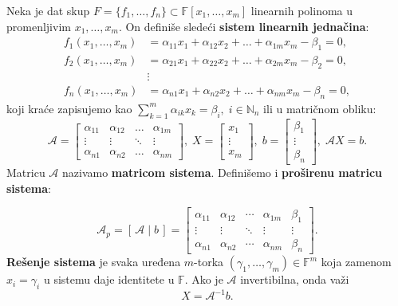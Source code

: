\documentclass[a4paper,12pt,twoside]{report}
\numberwithin{algorithm}{section}
\begin{document}
Neka je dat skup $F = \{f_1, \dots, f_n\} \subset \mathbb{F}[x_1, \dots, x_m]$ linearnih polinoma u promenljivim $x_1, \dots, x_m$. On definiše sledeći \textbf{sistem linearnih
jednačina}:
\[
    \begin{aligned}
        f_1(x_1, \dots, x_m) &= \alpha_{11}x_1 + \alpha_{12}x_2 + \dots + \alpha_{1m}x_m - \beta_1 = 0, \\
        f_2(x_1, \dots, x_m) &= \alpha_{21}x_1 + \alpha_{22}x_2 + \dots + \alpha_{2m}x_m - \beta_2 = 0, \\
        &\vdots \\
        f_n(x_1, \dots, x_m) &= \alpha_{n1}x_1 + \alpha_{n2}x_2 + \dots + \alpha_{nm}x_m - \beta_n = 0,
    \end{aligned}
\] koji kraće zapisujemo kao $\sum_{k=1}^{m} \alpha_{ik}x_k = \beta_i, \; i \in \mathbb{N}_n$ ili u matričnom obliku:
\[ \mathcal{A} = \begin{bmatrix}
    \alpha_{11} & \alpha_{12} & \dots & \alpha_{1m} \\
    \vdots      & \vdots      & \ddots & \vdots \\
    \alpha_{n1} & \alpha_{n2} & \dots & \alpha_{nm}
\end{bmatrix}, \; X = \begin{bmatrix}
    x_1 \\ \vdots \\ x_m
\end{bmatrix}, \; b = \begin{bmatrix}
    \beta_1 \\ \vdots \\ \beta_n
\end{bmatrix}, \; \mathcal{A}X = b. \]
Matricu $\mathcal{A}$ nazivamo \textbf{matricom sistema}. Definišemo i \textbf{proširenu matricu sistema}:

\[
\mathcal{A}_p = [\,\mathcal{A} \mid b\,] = 
\left[
\begin{array}{cccc|c}
\alpha_{11} & \alpha_{12} & \cdots & \alpha_{1m} & \beta_1 \\
\vdots      & \vdots      & \ddots & \vdots      & \vdots  \\
\alpha_{n1} & \alpha_{n2} & \cdots & \alpha_{nm} & \beta_n 
\end{array}
\right].
\]
\textbf{Rešenje sistema} je svaka uređena $m$-torka $(\gamma_1, \dots, \gamma_m) \in \mathbb{F}^m$ koja zamenom $x_i = \gamma_i$ u sistemu daje identitete u $\mathbb{F}$.
Ako je $\mathcal{A}$ invertibilna, onda važi
\[ X = \mathcal{A}^{-1}b. \]
\end{document}
